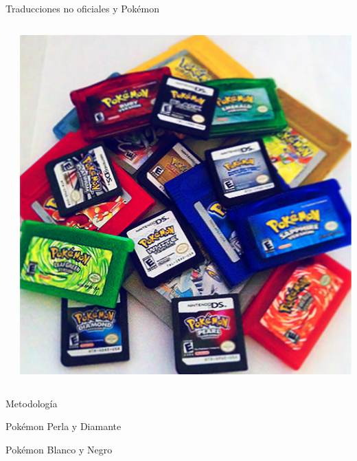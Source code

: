 \begin{frame}{Traducciones no oficiales y Pokémon}
\begin{columns}
\begin{column}{0.6\textwidth}
  \end{column}

  \begin{column}{0.4\textwidth}
    \includegraphics[width=\textwidth]{imgs/pokemon_cart.pdf}
  \end{column}
\end{columns}

\end{frame}


\begin{frame}{Metodología}

\end{frame}

\begin{frame}{Pokémon Perla y Diamante}

\end{frame}

\begin{frame}{Pokémon Blanco y Negro}

\end{frame}

